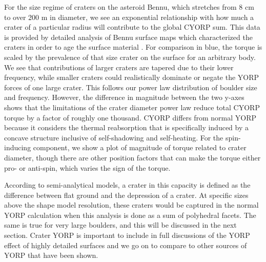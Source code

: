 For the size regime of craters on the asteroid Bennu, which stretches from 8 cm to over 200 m in diameter, we see an exponential relationship with how much a crater of a particular radius will contribute to the global CYORP sum. This data is provided by detailed analysis of Bennu surface maps which characterized the craters in order to age the surface material \citep{Bierhaus2022}. For comparison in blue, the torque is scaled by the prevalence of that size crater on the surface for an arbitrary body. We see that contributions of larger craters are tapered due to their lower frequency, while smaller craters could realistically dominate or negate the YORP forces of one large crater. This follows our power law distribution of boulder size and frequency. However, the difference in magnitude between the two y-axes shows that the limitations of the crater diameter power law reduce total CYORP torque by a factor of roughly one thousand. CYORP differs from normal YORP because it considers the thermal reabsorption that is specifically induced by a concave structure inclusive of self-shadowing and self-heating. For the spin-inducing component, we show a plot of magnitude of torque related to crater diameter, though there are other position factors that can make the torque either pro- or anti-spin, which varies the sign of the torque. 

According to semi-analytical models, a crater in this capacity is defined as the difference between flat ground and the depression of a crater. At specific sizes above the shape model resolution, these craters would be captured in the normal YORP calculation when this analysis is done as a sum of polyhedral facets. The same is true for very large boulders, and this will be discussed in the next section. Crater YORP is important to include in full discussions of the YORP effect of highly detailed surfaces and we go on to compare to other sources of YORP that have been shown.

